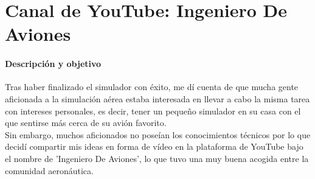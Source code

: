 \section[Canal Youtube]{Canal de YouTube: Ingeniero De Aviones}

\paragraph{Descripción y objetivo}

Tras haber finalizado el simulador con éxito, me dí cuenta de que mucha gente aficionada a la simulación aérea estaba interesada en llevar a cabo la misma tarea con intereses personales, es decir, tener un pequeño simulador en su casa con el que sentirse más cerca de su avión favorito.\\

Sin embargo, muchos aficionados no poseían los conocimientos técnicos por lo que decidí compartir mis ideas en forma de vídeo en la plataforma de YouTube bajo el nombre de 'Ingeniero De Aviones', lo que tuvo una muy buena acogida entre la comunidad aeronáutica.